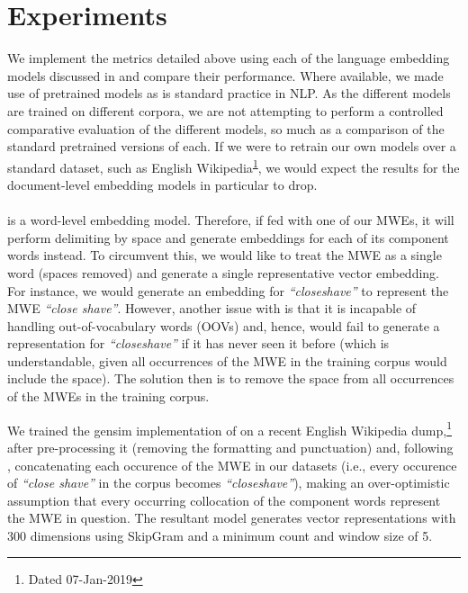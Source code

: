 \section{Experiments}
We implement the metrics detailed above using each of the language embedding models discussed in  and compare their performance. Where available, we made use of pretrained models as is standard practice in NLP. As the different models are trained on different corpora, we are not attempting to perform a controlled comparative evaluation of the different models, so much as a comparison of the standard pretrained versions of each. If we were to retrain our own models over a standard dataset, such as English Wikipedia\textsuperscript{\ref{wiki}}, we would expect the results for the document-level embedding models in particular to drop.

\paragraph{\wordtovec} \wordtovec is a word-level embedding model. Therefore, if fed with one of our MWEs, it will perform delimiting by space and generate embeddings for each of its component words instead. To circumvent this, we would like to treat the MWE as a single word (spaces removed) and generate a single representative vector embedding. For instance, we would generate an embedding for \textit{``closeshave''} to represent the MWE \textit{``close shave''}. However, another issue with \wordtovec is that it is incapable of handling out-of-vocabulary words (OOVs) and, hence, would fail to generate a representation for \textit{``closeshave''} if it has never seen it before (which is understandable, given all occurrences of the MWE in the training corpus would include the space). The solution then is to remove the space from all occurrences of the MWEs in the training corpus.

We trained the gensim implementation of \wordtovec on a recent English Wikipedia dump,\footnote{\label{wiki}Dated 07-Jan-2019} after pre-processing it (removing the formatting and punctuation) and, following \cite{Salehi2015}, concatenating each occurence of the MWE in our datasets (i.e., every occurence of \textit{``close shave''} in the corpus becomes \textit{``closeshave''}), making an over-optimistic assumption that every occurring collocation of the component words represent the MWE in question. The resultant \wordtovec model generates vector representations with 300 dimensions using SkipGram and a minimum count and window size of 5.


